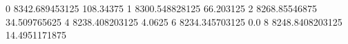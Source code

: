 0 8342.689453125 108.34375
1 8300.548828125 66.203125
2 8268.85546875 34.509765625
4 8238.408203125 4.0625
6 8234.345703125 0.0
8 8248.8408203125 14.4951171875
